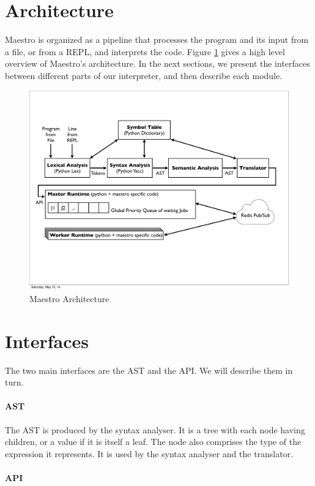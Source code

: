 \section{Architecture}
Maestro is organized as a pipeline that processes the program and its input from a file, or from a REPL, and interprets the code. Figure \ref{fig:archi} gives a high level overview of Maestro's architecture.
In the next sections, we present the interfaces between different parts of our interpreter, and then describe each module.

\begin{figure}[h!]
  \centering
  \includegraphics[width=15cm]{figures/archi.pdf}
  \caption{Maestro Architecture}
\label{fig:archi}
\end{figure}

\section{Interfaces}
The two main interfaces are the AST and the API. We will describe them in turn.

\paragraph{AST}

The AST is produced by the syntax analyser.
It is a tree with each node having children, or a value if it is itself a leaf.
The node also comprises the type of the expression it represents.
It is used by the syntax analyser and the translator.

\paragraph{API}

